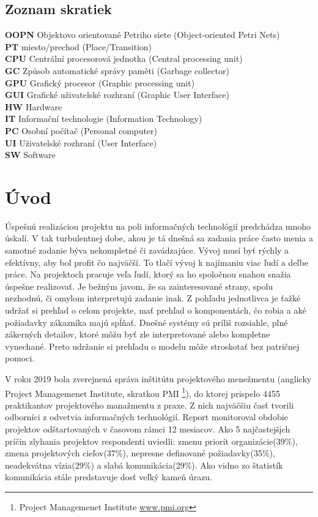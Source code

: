 \theoremstyle{definition}
\newtheorem{defn}{Definícia}[section]
\newtheorem{note}{Poznámka}[section]
\newtheorem{exmpl}{Príklad}[section]

\newpage
\section*{Zoznam skratiek}
\textbf{OOPN} Objektovo orientované Petriho siete (Object-oriented Petri Nets)\\
\textbf{PT} miesto/prechod (Place/Transition)\\
\textbf{CPU} Centrální procesorová jednotka (Central processing unit)\\
\textbf{GC} Způsob automatické správy paměti (Garbage collector)\\
\textbf{GPU} Grafický procesor (Graphic processing unit)\\
\textbf{GUI} Grafické uživatelské rozhraní (Graphic User Interface)\\
\textbf{HW} Hardware\\
\textbf{IT} Informační technologie (Information Technology)\\
\textbf{PC} Osobní počítač (Personal computer)\\
\textbf{UI} Uživatelské rozhraní (User Interface)\\
\textbf{SW} Software\\
\newpage

\chapter{Úvod}

Úspešnú realizáciou projektu na poli informačných technológií predchádza mnoho úskalí. V tak turbulentnej dobe, akou je tá dnešná sa zadania práce často menia a samotné zadanie býva nekompletné či zavádzajúce. Vývoj musí byť rýchly a efektívny, aby bol profit čo najväčší. To tlačí vývoj k najímaniu viac ľudí a deľbe práce. Na projektoch pracuje veľa ľudí, ktorý sa ho spoločnou snahou snažia úspešne realizovať. Je bežným javom, že sa zainteresované strany, spolu nezhodnú, či omylom interpretujú zadanie inak. Z pohľadu jednotlivca je ťažké udržať si prehľad o celom projekte, mať prehľad o komponentách, čo robia a aké požiadavky zákazníka majú spĺňať. Dnešné systémy sú príliš rozsiahle, plné zákerných detailov, ktoré môžu byť zle interpretované alebo kompletne vynechané. Preto udržanie si prehľadu o modelu môže stroskotať bez patričnej pomoci. 

V roku 2019 bola zverejnená správa inštitútu projektového menežmentu (anglicky Project Managemenet Institute, skratkou PMI \footnote{Project Managemenet Institute \url{www.pmi.org}}), do ktorej prispelo 4455 praktikantov projektového manažmentu z praxe. Z nich najväčšiu časť tvorili odborníci z odvetvia informačných technológií. Report monitoroval obdobie projektov odštartovaných v časovom rámci 12 mesiacov. Ako 5 najčastejšįch príčin zlyhania projektov respondenti uviedli: zmenu priorít organizácie(39\%), zmena projektových cieľov(37\%), nepresne definované požiadavky(35\%), neadekvátna vízia(29\%) a slabá komunikácia(29\%). \cite{pulse}
Ako vidno zo štatistík komunikácia stále predstavuje dosť veľký kameň úrazu.

